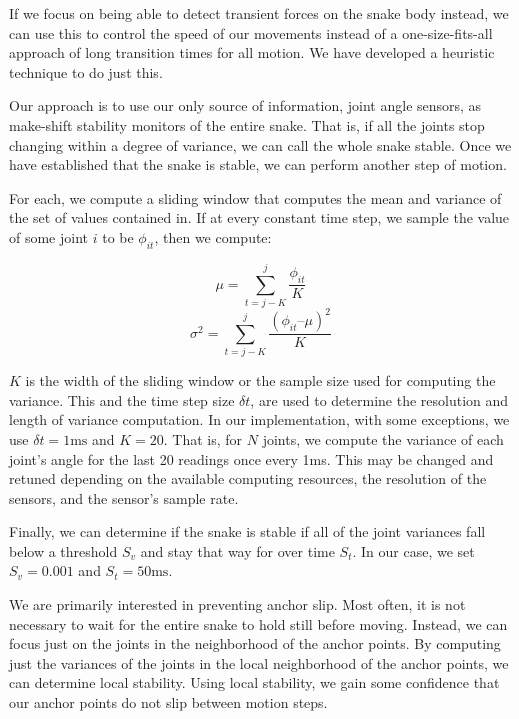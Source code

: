 If we focus on being able to detect transient forces on the snake body instead, we can use this to control the speed of our movements instead of a one-size-fits-all approach of long transition times for all motion. We have developed a heuristic technique to do just this.

Our approach is to use our only source of information, joint angle sensors, as make-shift stability monitors of the entire snake. That is, if all the joints stop changing within a degree of variance, we can call the whole snake stable. Once we have established that the snake is stable, we can perform another step of motion. 

For each, we compute a sliding window that computes the mean and variance of the set of values contained in. If at every constant time step, we sample the value of some joint $i$ to be $\phi_{it}$, then we compute:


\begin{equation}
\mu = \sum_{t = j-K}^{j} \frac{\phi_{it}}{K}
\end{equation}
\begin{equation}
\sigma^2 = \sum_{t=j-K}^{j} \frac{(\phi_{it} – \mu)^2}{K}
\end{equation}


$K$ is the width of the sliding window or the sample size used for computing the variance. This and the time step size $\delta t$, are used to determine the resolution and length of variance computation. In our implementation, with some exceptions, we use $\delta t = 1\mathrm{ms}$ and $K = 20$. That is, for $N$ joints, we compute the variance of each joint's angle for the last 20 readings once every 1ms. This may be changed and retuned depending on the available computing resources, the resolution of the sensors, and the sensor's sample rate.

Finally, we can determine if the snake is stable if all of the joint variances fall below a threshold $S_v$ and stay that way for over time $S_t$. In our case, we set $S_v = 0.001$ and $S_t = 50\mathrm{ms}$.

We are primarily interested in preventing anchor slip. Most often, it is not necessary to wait for the entire snake to hold still before moving. Instead, we can focus just on the joints in the neighborhood of the anchor points. By computing just the variances of the joints in the local neighborhood of the anchor points, we can determine local stability. Using local stability, we gain some confidence that our anchor points do not slip between motion steps.

